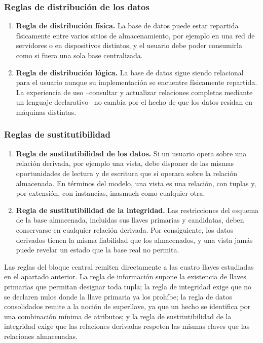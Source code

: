 \subsubsection*{Reglas de distribución de los datos}

\begin{enumerate}[leftmargin=1.9em,itemsep=0.55em,start=9]
  \item \textbf{Regla de distribución física.} La base de datos puede estar
    repartida físicamente entre varios sitios de almacenamiento, por ejemplo
    en una red de servidores o en dispositivos distintos, y el usuario debe
    poder consumirla como si fuera una sola base centralizada.
  \item \textbf{Regla de distribución lógica.} La base de datos sigue siendo
    relacional para el usuario aunque su implementación se encuentre
    físicamente repartida. La experiencia de uso --consultar y actualizar
    relaciones completas mediante un lenguaje declarativo-- no cambia por el
    hecho de que los datos residan en máquinas distintas.
\end{enumerate}

\subsubsection*{Reglas de sustitutibilidad}

\begin{enumerate}[leftmargin=1.9em,itemsep=0.55em,start=11]
  \item \textbf{Regla de sustitutibilidad de los datos.} Si un usuario opera
    sobre una relación derivada, por ejemplo una vista, debe disponer de las
    mismas oportunidades de lectura y de escritura que si operara sobre la
    relación almacenada. En términos del modelo, una vista es una relación,
    con tuplas y, por extensión, con instancias, inasmuch como cualquier otra.
  \item \textbf{Regla de sustitutibilidad de la integridad.} Las restricciones
    del esquema de la base almacenada, incluidas sus llaves primarias y
    candidatas, deben conservarse en cualquier relación derivada. Por
    consiguiente, los datos derivados tienen la misma fiabilidad que los
    almacenados, y una vista jamás puede revelar un estado que la base real no
    permita.
\end{enumerate}

\begin{conceptobox}
Las reglas del bloque central remiten directamente a las cuatro llaves
  estudiadas en el apartado anterior. La regla de información supone la
  existencia de llaves primarias que permitan designar toda tupla; la regla de
  integridad exige que no se declaren nulos donde la llave primaria ya los
  prohíbe; la regla de datos consolidados remite a la noción de superllave, ya
  que un hecho se identifica por una combinación mínima de atributos; y la
  regla de sustitutibilidad de la integridad exige que las relaciones
  derivadas respeten las mismas claves que las relaciones almacenadas.
\end{conceptobox}

